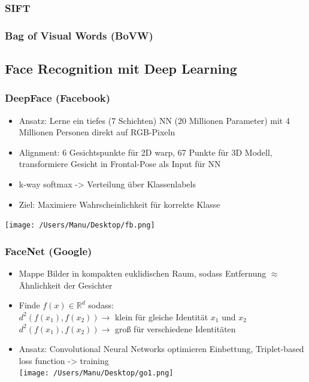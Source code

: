 \documentclass[paper=a4, fontsize=11pt]{scrartcl} %
\numberwithin{equation}{section} %
\numberwithin{figure}{section} %
\numberwithin{table}{section} %
\begin{document}
\subsubsection{SIFT}

\subsubsection{Bag of Visual Words (BoVW)}

\subsection{Face Recognition mit Deep Learning}

\subsubsection{DeepFace (Facebook)}

\begin{itemize}
\item Ansatz: Lerne ein tiefes (7 Schichten) NN (20 Millionen Parameter) mit 4 Millionen Personen direkt auf RGB-Pixeln
\item Alignment: 6 Gesichtspunkte für 2D warp, 67 Punkte für 3D Modell, transformiere Gesicht in Frontal-Pose als Input für NN
\item k-way softmax -> Verteilung über Klassenlabels
\item Ziel: Maximiere Wahrscheinlichkeit für korrekte Klasse
\end{itemize}

\texttt{[image: /Users/Manu/Desktop/fb.png]}

\subsubsection{FaceNet (Google)}

\begin{itemize}
\item Mappe Bilder in kompakten euklidischen Raum, sodass Entfernung $\approx$ Ähnlichkeit der Gesichter
\item Finde $f(x) \in \mathbb{R}^d$ sodass:\\ 
$d^2(f(x_1), f(x_2)) \rightarrow$ klein für gleiche Identität $x_1$ und $x_2$\\ 
$d^2(f(x_1), f(x_2)) \rightarrow$ groß für verschiedene Identitäten 
\item Ansatz: Convolutional Neural Networks optimieren Einbettung, Triplet-based loss function -> training\\ 
\texttt{[image: /Users/Manu/Desktop/go1.png]}
\end{itemize}
\end{document}
